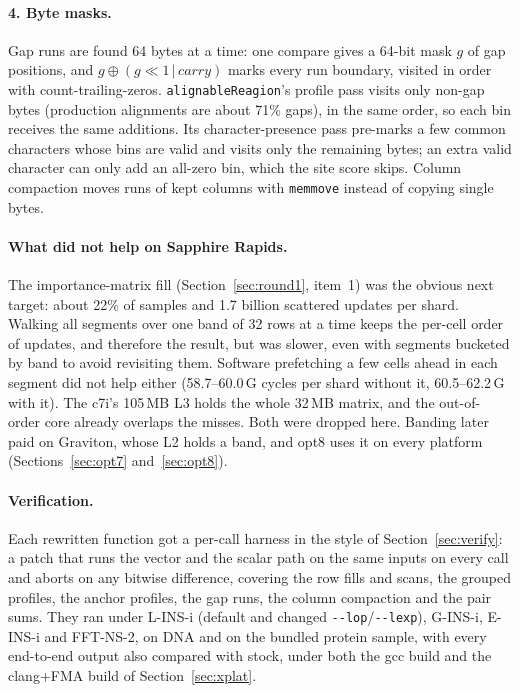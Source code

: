 \documentclass[11pt]{article}
\newcommand{\code}[1]{\texttt{#1}}
\begin{document}
\paragraph{4. Byte masks.} Gap runs are found 64 bytes at a time: one compare gives a 64-bit
mask $g$ of gap positions, and $g \oplus (g \ll 1 \,|\, \mathit{carry})$ marks every run
boundary, visited in order with count-trailing-zeros. \code{alignableReagion}'s profile pass
visits only non-gap bytes (production alignments are about 71\% gaps), in the same order, so
each bin receives the same additions. Its character-presence pass pre-marks a few common
characters whose bins are valid and visits only the remaining bytes; an extra valid
character can only add an all-zero bin, which the site score skips. Column compaction moves
runs of kept columns with \code{memmove} instead of copying single bytes.

\paragraph{What did not help on Sapphire Rapids.} The importance-matrix fill
(Section~\ref{sec:round1}, item~1) was the obvious next target: about 22\% of samples and
1.7 billion scattered updates per shard. Walking all segments over one band of 32 rows at a
time keeps the per-cell order of updates, and therefore the result, but was slower, even
with segments bucketed by band to avoid revisiting them. Software prefetching a few cells
ahead in each segment did not help either (58.7--60.0\,G cycles per shard without it,
60.5--62.2\,G with it). The c7i's 105\,MB
L3 holds the whole 32\,MB matrix, and the out-of-order core already overlaps the misses.
Both were dropped here. Banding later paid on Graviton, whose L2 holds a band, and opt8 uses
it on every platform (Sections~\ref{sec:opt7} and~\ref{sec:opt8}).

\paragraph{Verification.} Each rewritten function got a per-call harness in the style of
Section~\ref{sec:verify}: a patch that runs the vector and the scalar path on the same
inputs on every call and aborts on any bitwise difference, covering the row fills and scans,
the grouped profiles, the anchor profiles, the gap runs, the column compaction and the pair
sums. They ran under L-INS-i (default and changed \code{-{}-lop}/\code{-{}-lexp}), G-INS-i,
E-INS-i and FFT-NS-2, on DNA and on the bundled protein sample, with every end-to-end
output also compared with stock, under both the gcc build and the clang+FMA build of
Section~\ref{sec:xplat}.
\end{document}
